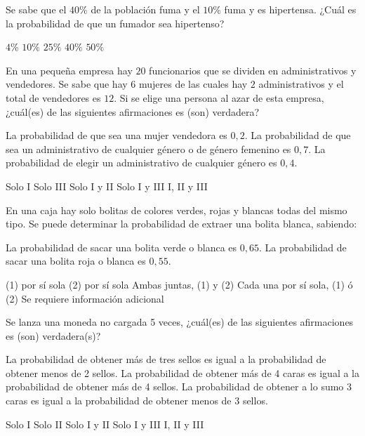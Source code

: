 \documentclass[sin nombre]{srs2}
\begin{document}
\begin{preguntas}
\pregunta Se sabe que el $40\%$ de la población fuma y el $10\%$ fuma y es hipertensa. ¿Cuál es la probabilidad de que un fumador sea hipertenso?
\begin{alternativas}
\alternativa $4\%$
\alternativa $10\%$
\alternativa $25\%$
\alternativa $40\%$
\alternativa $50\%$
\end{alternativas}

\pregunta En una pequeña empresa hay $20$ funcionarios que se dividen en administrativos y vendedores. Se sabe que hay $6$ mujeres de las cuales hay $2$ administrativos y el total de vendedores es $12$. Si se elige una persona al azar de esta empresa, ¿cuál(es) de las siguientes afirmaciones es (son) verdadera?
\begin{opciones}
\opcion La probabilidad de que sea una mujer vendedora es $0,2$.
\opcion La probabilidad de que sea un administrativo de cualquier género o de género femenino es $0,7$.
\opcion La probabilidad de elegir un administrativo de cualquier género es $0,4$.
\end{opciones}
\begin{alternativas}
\alternativa Solo I
\alternativa Solo III
\alternativa Solo I y II
\alternativa Solo I y III
\alternativa I, II y III
\end{alternativas}

\pregunta En una caja hay solo bolitas de colores verdes, rojas y blancas todas del mismo tipo. Se puede determinar la probabilidad de extraer una bolita blanca, sabiendo:
\begin{opciones*}
\opcion La probabilidad de sacar una bolita verde o blanca es $0,65$.
\opcion La probabilidad de sacar una bolita roja o blanca es $0,55$.
\end{opciones*}
\begin{alternativas}
\alternativa (1) por sí sola
\alternativa (2) por sí sola
\alternativa Ambas juntas, (1) y (2)
\alternativa Cada una por sí sola, (1) ó (2)
\alternativa Se requiere información adicional
\end{alternativas}

\pregunta Se lanza una moneda no cargada 5 veces, ¿cuál(es) de las siguientes afirmaciones es (son) verdadera(s)?
\begin{opciones}
\opcion La probabilidad de obtener más de tres sellos es igual a la probabilidad de obtener menos de 2 sellos.
\opcion La probabilidad de obtener más de 4 caras es igual a la probabilidad de obtener más de 4 sellos.
\opcion La probabilidad de obtener a lo sumo 3 caras es igual a la probabilidad de obtener menos de 3 sellos.
\end{opciones}
\begin{alternativas}
\alternativa Solo I
\alternativa Solo II
\alternativa Solo I y II
\alternativa Solo I y III
\alternativa I, II y III
\end{alternativas}


\end{preguntas}
\end{document}
